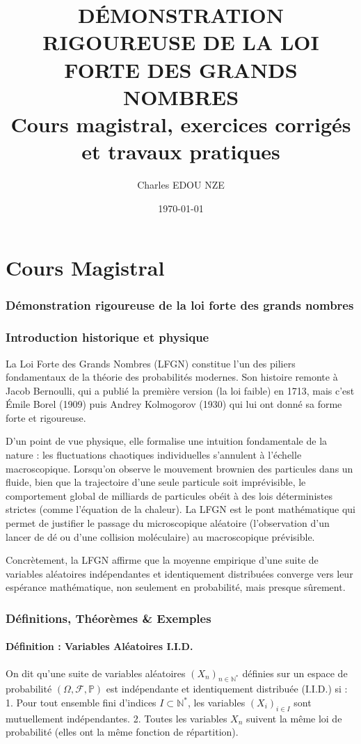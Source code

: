 \documentclass[11pt,a4paper]{article}
\title{\Huge DÉMONSTRATION RIGOUREUSE DE LA LOI FORTE DES GRANDS NOMBRES \\ \large Cours magistral, exercices corrigés et travaux pratiques}
\author{\Large Charles EDOU NZE}
\date{\today}
\begin{document}
\maketitle
\tableofcontents
\newpage

\part{Cours Magistral}

\section*{Démonstration rigoureuse de la loi forte des grands nombres}

\section{Introduction historique et physique}

La Loi Forte des Grands Nombres (LFGN) constitue l'un des piliers fondamentaux de la théorie des probabilités modernes. Son histoire remonte à Jacob Bernoulli, qui a publié la première version (la loi faible) en 1713, mais c'est Émile Borel (1909) puis Andrey Kolmogorov (1930) qui lui ont donné sa forme forte et rigoureuse.

D'un point de vue physique, elle formalise une intuition fondamentale de la nature : les fluctuations chaotiques individuelles s'annulent à l'échelle macroscopique. Lorsqu'on observe le mouvement brownien des particules dans un fluide, bien que la trajectoire d'une seule particule soit imprévisible, le comportement global de milliards de particules obéit à des lois déterministes strictes (comme l'équation de la chaleur). La LFGN est le pont mathématique qui permet de justifier le passage du microscopique aléatoire (l'observation d'un lancer de dé ou d'une collision moléculaire) au macroscopique prévisible.

Concrètement, la LFGN affirme que la moyenne empirique d'une suite de variables aléatoires indépendantes et identiquement distribuées converge vers leur espérance mathématique, non seulement en probabilité, mais presque sûrement.

\section{Définitions, Théorèmes \& Exemples}

\subsection{Définition : Variables Aléatoires I.I.D.}
On dit qu'une suite de variables aléatoires $(X_n)_{n \in \mathbb{N}^*}$ définies sur un espace de probabilité $(\Omega, \mathcal{F}, \mathbb{P})$ est indépendante et identiquement distribuée (I.I.D.) si :
1. Pour tout ensemble fini d'indices $I \subset \mathbb{N}^*$, les variables $(X_i)_{i \in I}$ sont mutuellement indépendantes.
2. Toutes les variables $X_n$ suivent la même loi de probabilité (elles ont la même fonction de répartition).
\end{document}
